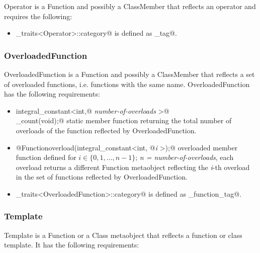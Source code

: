 {\metaobject Operator} is a {\metaobject Function} and possibly a {\metaobject ClassMember}
that reflects an operator and requires the following:

\begin{itemize}
	\item \verb@metaobject_traits<Operator>::category@ is defined as  \verb@operator_tag@.
\end{itemize}

\subsubsection{OverloadedFunction}

{\metaobject OverloadedFunction} is a {\metaobject Function} and possibly a {\metaobject ClassMember}
that reflects a set of overloaded functions, i.e. functions with the same name.
{\metaobject OverloadedFunction} has the following requirements:

\begin{itemize}

	\item{\verb@static integral_constant<int,@ {\em number-of-overloads}
	\verb@>@\\\verb@overload_count(void);@} static member function returning the total number
	of overloads of the function reflected by {\metaobject OverloadedFunction}.

	\item{\verb@static @{\metaobject Function}\verb@ overload(integral_constant<int, @{\em i}
	\verb@>);@} overloaded member function defined
	for $i \in \{0, 1, \dots, n-1\}$; {\em n = number-of-overloads},
	each overload returns a different {\metaobject Function} metaobject reflecting the {\em i}-th overload
	in the set of functions reflected by {\metaobject OverloadedFunction}.

	\item \verb@metaobject_traits<OverloadedFunction>::category@ is defined as 
	\verb@overloaded_function_tag@.
\end{itemize}

\subsubsection{Template}

{\metaobject Template} is a {\metaobject Function} or a {\metaobject Class} metaobject
that reflects a function or class template. It has the following requirements:

